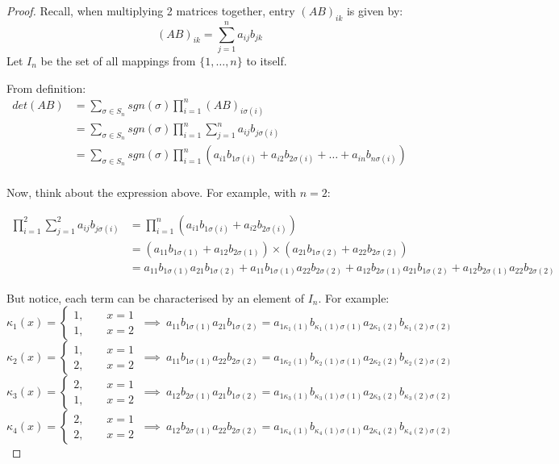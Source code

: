\documentclass{exam}
\begin{document}
\begin{proof}

Recall, when multiplying 2 matrices together, entry $(AB)_{ik}$ is given by:
\[
(AB)_{ik} = \sum_{j = 1}^n a_{ij}b_{jk}
\]
Let $I_n$ be the set of all mappings from $\{1,\ldots,n\}$ to itself.

\bigskip

From definition:
\begin{align*}
    det(AB) &= \sum_{\sigma \in S_n} sgn(\sigma) \prod_{i = 1}^n (AB)_{i \sigma(i)} \\
    &= \sum_{\sigma \in S_n} sgn(\sigma) \prod_{i = 1}^n \sum_{j = 1}^n a_{ij}b_{j\sigma(i)} \\
    &= \sum_{\sigma \in S_n} sgn(\sigma) \prod_{i = 1}^n (a_{i1}b_{1\sigma(i)} + a_{i2}b_{2\sigma(i)} + \ldots + a_{in}b_{n\sigma(i)}) \\
\end{align*}

Now, think about the expression above. For example, with $n = 2$:

\begin{align*}
    \prod_{i = 1}^2 \sum_{j = 1}^2 a_{ij}b_{j\sigma(i)} &= \prod_{i = 1}^n (a_{i1}b_{1\sigma(i)} + a_{i2}b_{2\sigma(i)}) \\
    &= (a_{11}b_{1\sigma(1)} + a_{12}b_{2\sigma(1)}) \times (a_{21}b_{1\sigma(2)} + a_{22}b_{2\sigma(2)}) \\
    &= a_{11}b_{1\sigma(1)}a_{21}b_{1\sigma(2)} + a_{11}b_{1\sigma(1)}a_{22}b_{2\sigma(2)} + a_{12}b_{2\sigma(1)}a_{21}b_{1\sigma(2)} + a_{12}b_{2\sigma(1)}a_{22}b_{2\sigma(2)}
\end{align*}

But notice, each term can be characterised by an element of $I_n$. For example:
\[
\kappa_1(x) = \begin{cases}
1, \qquad x = 1 \\
1, \qquad x = 2
\end{cases}
\ \implies \
a_{11}b_{1\sigma(1)}a_{21}b_{1\sigma(2)} = a_{1\kappa_1(1)}b_{\kappa_1(1)\sigma(1)}a_{2\kappa_1(2)}b_{\kappa_1(2)\sigma(2)}
\]
\[
\kappa_2(x) = \begin{cases}
1, \qquad x = 1 \\
2, \qquad x = 2
\end{cases}
\ \implies \
a_{11}b_{1\sigma(1)}a_{22}b_{2\sigma(2)} = a_{1\kappa_2(1)}b_{\kappa_2(1)\sigma(1)}a_{2\kappa_2(2)}b_{\kappa_2(2)\sigma(2)}
\]
\[
\kappa_3(x) = \begin{cases}
2, \qquad x = 1 \\
1, \qquad x = 2
\end{cases}
\ \implies \
a_{12}b_{2\sigma(1)}a_{21}b_{1\sigma(2)} = a_{1\kappa_3(1)}b_{\kappa_3(1)\sigma(1)}a_{2\kappa_3(2)}b_{\kappa_3(2)\sigma(2)}
\]
\[
\kappa_4(x) = \begin{cases}
2, \qquad x = 1 \\
2, \qquad x = 2
\end{cases}
\ \implies \
a_{12}b_{2\sigma(1)}a_{22}b_{2\sigma(2)} = a_{1\kappa_4(1)}b_{\kappa_4(1)\sigma(1)}a_{2\kappa_4(2)}b_{\kappa_4(2)\sigma(2)}
\]


\end{proof}
\end{document}

